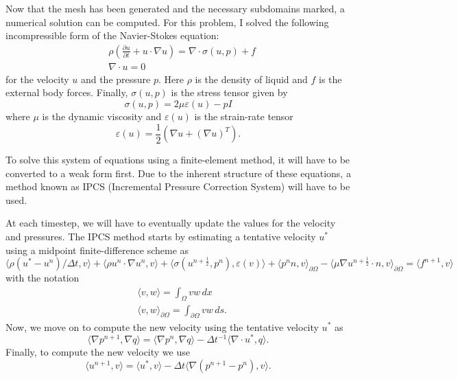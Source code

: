 \documentclass[12pt]{article}
\theoremstyle{definition}
\numberwithin{equation}{section}
\renewcommand{\epsilon}{\varepsilon}
\begin{document}
	Now that the mesh has been generated and the necessary subdomains marked, a numerical solution can be computed. For this problem, I solved the following incompressible form of the Navier-Stokes equation:
	\begin{align}
	&\rho\left(\frac{\partial u}{\partial t} + u \cdot \nabla u\right) = \nabla\cdot \sigma(u,p) + f \\
	&\nabla \cdot u = 0
	\end{align}
	for the velocity $u$ and the pressure $p$. Here $\rho$ is the density of liquid and $f$ is the external body forces. Finally, $\sigma(u,p)$ is the stress tensor given by 
	\begin{equation}
	\sigma(u,p)=2\mu\epsilon(u)-pI
	\end{equation}
	where $\mu$ is the dynamic viscosity and $\epsilon(u)$ is the strain-rate tensor
	\begin{equation}
	\epsilon(u) = \frac{1}{2}\left(\nabla u + (\nabla u)^T\right).
	\end{equation}
	
	To solve this system of equations using a finite-element method, it will have to be converted to a weak form first. Due to the inherent structure of these equations, a method known as IPCS \cite{goda1979multistep} (Incremental Pressure Correction System) will have to be used. 
	
	At each timestep, we will have to eventually update the values for the velocity and pressures. The IPCS method starts by estimating a tentative velocity $u^*$ using a midpoint finite-difference scheme as
	\begin{equation}\label{eq:tenvel}
	\langle\rho(u^*-u^n)/\Delta t,v\rangle+\langle\rho u^n\cdot\nabla u^n,v\rangle+\langle \sigma(u^{n+\frac{1}{2}},p^n),\epsilon(v)\rangle+\langle 	p^nn,v\rangle_{\partial\Omega}-\langle \mu\nabla u^{n+\frac{1}{2}}\cdot n,v\rangle_{\partial\Omega}=\langle f^{n+1},v\rangle
	\end{equation}
	with the notation
	\begin{align*}
	&\langle v,w\rangle=\int_\Omega vw\,dx\\
	&\langle v,w\rangle_{\partial\Omega} = \int_{\partial\Omega}vw\,ds.
	\end{align*}
	Now, we move on to compute the new velocity using the tentative velocity $u^*$ as
	\begin{equation}\label{eq:newpress}
	\langle\nabla p^{n+1},\nabla q\rangle=\langle\nabla p^n,\nabla q\rangle-\Delta t^{-1}\langle\nabla\cdot u^*,q\rangle.
	\end{equation}
	Finally, to compute the new velocity we use
	\begin{equation}\label{eq:newvel}
	\langle u^{n+1},v\rangle=\langle u^*,v\rangle-\Delta t\langle\nabla(p^{n+1}−p^n),v\rangle.
	\end{equation}
	
\end{document}
